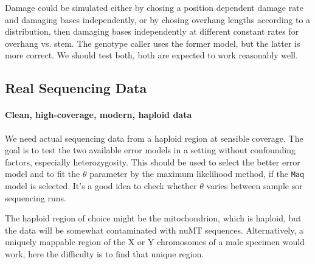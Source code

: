 \documentclass{article}
\begin{document}
Damage could be simulated either by chosing a position dependent damage
rate and damaging bases independently, or by chosing overhang lengths
according to a distribution, then damaging bases independently at
different constant rates for overhang vs. stem.  The genotype caller
uses the former model, but the latter is more correct.  We should test
both, both are expected to work reasonably well.



\subsection{Real Sequencing Data}

\paragraph{Clean, high-coverage, modern, haploid data}

We need actual sequencing data from a haploid region at sensible
coverage.  The goal is to test the two available error models in a
setting without confounding factors, especially heterozygosity.  This
should be used to select the better error model and to fit the $\theta$
parameter by the maximum likelihood method, if the \texttt{Maq} model is
selected.  It's a good idea to check whether $\theta$ varies between
sample sor sequencing runs.

The haploid region of choice might be the mitochondrion, which is
haploid, but the data will be somewhat contaminated with nuMT sequences.
Alternatively, a uniquely mappable region of the X or Y chromosomes of a
male specimen would work, here the difficulty is to find that unique
region.

\end{document}
